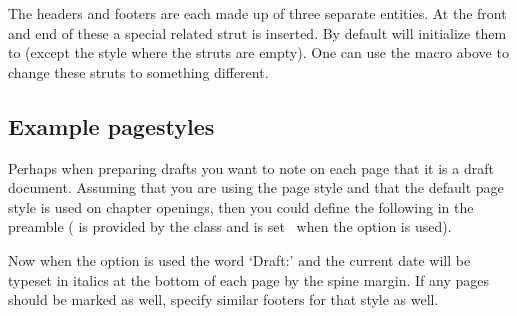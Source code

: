 \begin{syntax}
  \cmd{\makeheadfootstrut}
\end{syntax}
The headers and footers are each made up of three separate
entities. At the front and end of these a special  related
strut is inserted. By default \cmd{\makepagestyle} will initialize
them to \cmd{\strut} (except the  style where the struts
are empty). One can use the macro above to change these struts to
something different.


\subsection{Example pagestyles}

    Perhaps when preparing drafts you want to note on each page
that it is a draft document. Assuming that 
you are using the 
 page style and that the default 
page style is used on chapter openings, then you could define
the following in the preamble ( is provided by
the class and is set \ptrue\ when the  option is used).
\label{ex:draft.pagestyle}
\begin{lcode}
\ifdraftdoc
\fi
\end{lcode}
Now when the  option is used the word `Draft:' and the current
date will be typeset in italics at the bottom of each page by the spine
margin. If any  pages should be marked as well, specify
similar footers for that style as well.

